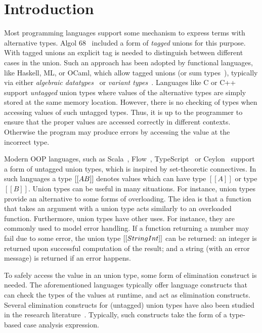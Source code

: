 \section{Introduction}
\label{sec:intro}

Most programming languages support some mechanism to express terms
with alternative types. Algol 68~\cite{} included a form of
\emph{tagged} unions for this purpose. With tagged unions
an explicit tag is needed to distinguish between different cases in the
union. Such an approach has been adopted by functional languages, like Haskell, ML, or
OCaml, which allow tagged unions (or sum types~\cite{}), typically via
either \emph{algebraic datatypes}~\cite{} or \emph{variant types}~\cite{}.
Languages like C or C++ support \emph{untagged} union types where
values of the alternative types are simply stored at the same memory
location. However, there is no checking of types when accessing values of
such untagged types. Thus, it is up to the programmer to ensure that the proper
values are accessed correctly in different contexts. Otherwise the
program may produce errors by accessing the value at the incorrect type.

Modern OOP languages, such as Scala~\cite{}, Flow~\cite{},
TypeScript~\cite{} or Ceylon~\cite{} support a form
of untagged union types, which is inspired by set-theoretic connectives.
In such languages a type $[[A \/ B]]$ denotes values which can have type
$[[A]]$ or type $[[B]]$. Union types can be useful in many situations.
For instance, union types provide an alternative to some forms
of overloading. The idea is that a function that takes an argument
with a union type acts similarly to an overloaded function.
Furthermore, union types have other uses.
For instance, they are commonly used to model error handling.
If a function returning a number may fail due to some
error, the union type $[[String \/ Int]]$ can be returned: an integer
is returned upon successful computation of the result; and
a string (with an error message) is returned if an error happens.

To safely access the value in an union type, some form of elimination
construct is needed. The aforementioned languages typically offer
language constructs that can check the types of the values at runtime,
and act as elimination constructs. Several elimination constructs for
(untagged) union types have also been studied in the research
literature~\cite{}. Typically, such constructs take the form of a
type-based case analysis expression.

